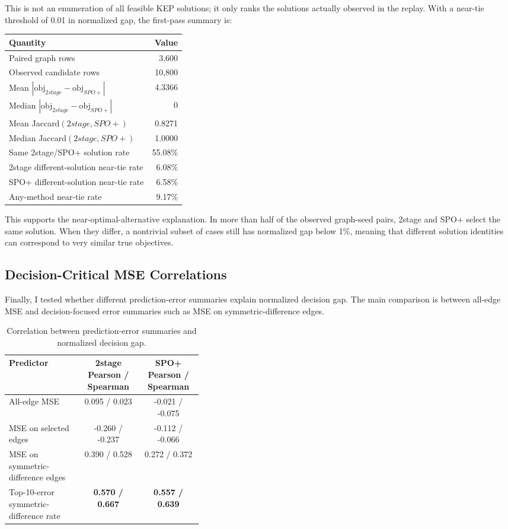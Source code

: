 \documentclass[11pt]{article}
\begin{document}
This is not an enumeration of all feasible KEP solutions; it only ranks the
solutions actually observed in the replay. With a near-tie threshold of 0.01 in
normalized gap, the first-pass summary is:

\begin{center}
\small
\begin{tabular}{lr}
\toprule
Quantity & Value \\
\midrule
Paired graph rows & 3,600 \\
Observed candidate rows & 10,800 \\
Mean $| \mathrm{obj}_{2stage} - \mathrm{obj}_{SPO+} |$ & 4.3366 \\
Median $| \mathrm{obj}_{2stage} - \mathrm{obj}_{SPO+} |$ & 0 \\
Mean Jaccard$(2stage, SPO+)$ & 0.8271 \\
Median Jaccard$(2stage, SPO+)$ & 1.0000 \\
Same 2stage/SPO+ solution rate & 55.08\% \\
2stage different-solution near-tie rate & 6.08\% \\
SPO+ different-solution near-tie rate & 6.58\% \\
Any-method near-tie rate & 9.17\% \\
\bottomrule
\end{tabular}
\end{center}

This supports the near-optimal-alternative explanation. In more than half of
the observed graph-seed pairs, 2stage and SPO+ select the same solution. When
they differ, a nontrivial subset of cases still has normalized gap below 1\%,
meaning that different solution identities can correspond to very similar true
objectives.

\subsection{Decision-Critical MSE Correlations}
Finally, I tested whether different prediction-error summaries explain
normalized decision gap. The main comparison is between all-edge MSE and
decision-focused error summaries such as MSE on symmetric-difference edges.

\begin{table}[H]
\centering
\small
\caption{Correlation between prediction-error summaries and normalized decision gap.}
\label{tab:critical-mse-correlations}
\begin{tabular}{p{0.38\linewidth}cc}
\toprule
Predictor & 2stage Pearson / Spearman & SPO+ Pearson / Spearman \\
\midrule
All-edge MSE & 0.095 / 0.023 & -0.021 / -0.075 \\
MSE on selected edges & -0.260 / -0.237 & -0.112 / -0.066 \\
MSE on symmetric-difference edges & 0.390 / 0.528 & 0.272 / 0.372 \\
Top-10-error symmetric-difference rate & \textbf{0.570 / 0.667} & \textbf{0.557 / 0.639} \\
\bottomrule
\end{tabular}
\end{table}
\end{document}
